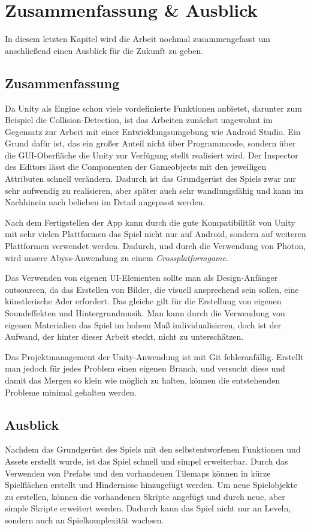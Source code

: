 \chapter{Zusammenfassung \& Ausblick}
\label{cha:zusammenfassungAusblick}
In diesem letzten Kapitel wird die Arbeit nochmal zusammengefasst um anschließend einen Ausblick für die Zukunft zu geben.

\section{Zusammenfassung}
\label{sec:grundlagen:zusammenfassung}
Da Unity als Engine schon viele vordefinierte Funktionen anbietet, darunter zum Beispiel die Collision-Detection, ist das Arbeiten zunächst ungewohnt im Gegensatz zur Arbeit mit einer Entwicklungsumgebung wie Android Studio. Ein Grund dafür ist, das ein großer Anteil nicht über Programmcode, sondern über die GUI-Oberfläche die Unity zur Verfügung stellt realisiert wird. Der Inspector des Editors lässt die Componenten der Gameobjects mit den jeweiligen Attributen schnell verändern. Dadurch ist das Grundgerüst des Spiels zwar nur sehr aufwendig zu realisieren, aber später auch sehr wandlungsfähig und kann im Nachhinein nach belieben im Detail angepasst werden. 

Nach dem Fertigstellen der App kann durch die gute Kompatibilität von Unity mit sehr vielen Plattformen das Spiel nicht nur auf Android, sondern auf weiteren Plattformen verwendet werden. Dadurch, und durch die Verwendung von Photon, wird unsere Abyss-Anwendung zu einem \textit{Crossplatformgame}.

Das Verwenden von eigenen UI-Elementen sollte man als Design-Anfänger outsourcen, da das Erstellen von Bilder, die visuell ansprechend sein sollen, eine künstlerische Ader erfordert. Das gleiche gilt für die Erstellung von eigenen Soundeffekten und Hintergrundmusik. Man kann durch die Verwendung von eigenen Materialien das Spiel im hohem Maß individualisieren, doch ist der Aufwand, der hinter dieser Arbeit steckt, nicht zu unterschätzen. 

Das Projektmanagement der Unity-Anwendung ist mit Git fehleranfällig. Erstellt man jedoch für jedes Problem einen eigenen Branch, und versucht diese und damit das Mergen so klein wie möglich zu halten, können die entstehenden Probleme minimal gehalten werden.

\section{Ausblick}
\label{sec:grundlagen:ausblick}
Nachdem das Grundgerüst des Spiels mit den selbstentworfenen Funktionen und Assets erstellt wurde, ist das Spiel schnell und simpel erweiterbar. Durch das Verwenden von Prefabs und den vorhandenen Tilemaps können in kürze Spielflächen erstellt und Hindernisse hinzugefügt werden. Um neue Spielobjekte zu erstellen, können die vorhandenen Skripte angefügt und durch neue, aber simple Skripte erweitert werden. Dadurch kann das Spiel nicht nur an Leveln, sondern auch an Spielkomplexität wachsen.